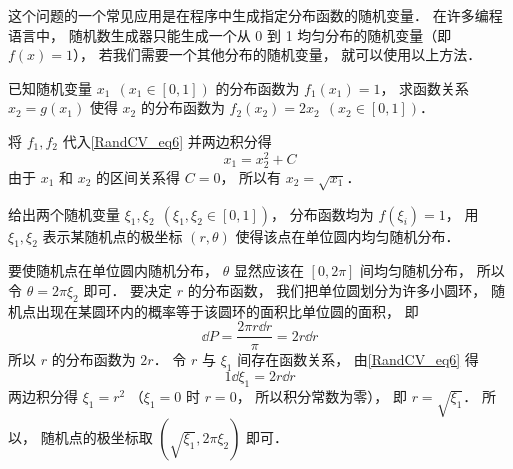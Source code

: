 这个问题的一个常见应用是在程序中生成指定分布函数的随机变量． 在许多编程语言中， 随机数生成器只能生成一个从 0 到 1 均匀分布的随机变量（即 $f(x) = 1$）， 若我们需要一个其他分布的随机变量， 就可以使用以上方法．

\begin{example}{}
已知随机变量 $x_1\ \ (x_1\in [0,1])$ 的分布函数为 $f_1(x_1) = 1$， 求函数关系 $x_2 = g(x_1)$ 使得 $x_2$ 的分布函数为 $f_2(x_2) = 2x_2\ \ (x_2\in [0,1])$．

将 $f_1, f_2$ 代入\autoref{RandCV_eq6} 并两边积分得
\begin{equation}
x_1 = x_2^2 + C
\end{equation}
由于 $x_1$ 和 $x_2$ 的区间关系得 $C = 0$， 所以有 $x_2 = \sqrt{x_1}$．
\end{example}

\begin{example}{}\label{RandCV_ex3}
给出两个随机变量 $\xi_1, \xi_2\ \ (\xi_1, \xi_2\in [0,1])$， 分布函数均为 $f(\xi_i) = 1$， 用 $\xi_1, \xi_2$ 表示某随机点的极坐标 $(r,\theta)$ 使得该点在单位圆内均匀随机分布．

要使随机点在单位圆内随机分布， $\theta$ 显然应该在 $[0,2\pi]$ 间均匀随机分布， 所以令 $\theta = 2\pi\xi_2$ 即可． 要决定 $r$ 的分布函数， 我们把单位圆划分为许多小圆环， 随机点出现在某圆环内的概率等于该圆环的面积比单位圆的面积， 即
\begin{equation}
\dd{P} = \frac{2\pi r\dd{r}}{\pi} = 2r\dd{r}
\end{equation}
所以 $r$ 的分布函数为 $2r$． 令 $r$ 与 $\xi_1$ 间存在函数关系， 由\autoref{RandCV_eq6} 得
\begin{equation}
1\dd{\xi_1} = 2r\dd{r}
\end{equation}
两边积分得 $\xi_1 = r^2$ （$\xi_1 = 0$ 时 $r = 0$， 所以积分常数为零）， 即 $r = \sqrt{\xi_1}$． 所以， 随机点的极坐标取 $(\sqrt{\xi_1}, 2\pi \xi_2)$ 即可．
\end{example}
